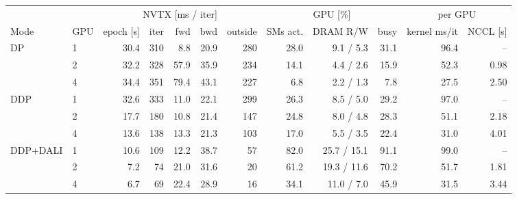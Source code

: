 \setlength{\tabcolsep}{3.8pt}
\begin{tabular}{@{}llrrrrrrrrrr@{}}
\toprule
& & \multicolumn{5}{c}{NVTX [ms / iter]} & \multicolumn{3}{c}{GPU [\%]} & \multicolumn{2}{c}{per GPU} \\
\cmidrule(lr){3-7}\cmidrule(lr){8-10}\cmidrule(l){11-12}
Mode & GPU & epoch [s] & iter & fwd & bwd & outside & SMs act. & DRAM R/W & busy & kernel ms/it & NCCL [s] \\
\midrule
\multirow{3}{*}{DP}       & 1 & 30.4 & 310 &  8.8 & 20.9 & 280 & 28.0 & 9.1 / 5.3 & 31.1 & 96.4 & -- \\
                          & 2 & 32.2 & 328 & 57.9 & 35.9 & 234 & 14.1 & 4.4 / 2.6 & 15.9 & 52.3 & 0.98 \\
                          & 4 & 34.4 & 351 & 79.4 & 43.1 & 227 &  6.8 & 2.2 / 1.3 &  7.8 & 27.5 & 2.50 \\
\midrule
\multirow{3}{*}{DDP}      & 1 & 32.6 & 333 & 11.0 & 22.1 & 299 & 26.3 & 8.5 / 5.0 & 29.2 & 97.0 & -- \\
                          & 2 & 17.7 & 180 & 10.8 & 21.4 & 147 & 24.8 & 8.0 / 4.8 & 28.3 & 51.1 & 2.18 \\
                          & 4 & 13.6 & 138 & 13.3 & 21.3 & 103 & 17.0 & 5.5 / 3.5 & 22.4 & 31.0 & 4.01 \\
\midrule
\multirow{3}{*}{DDP+DALI} & 1 & 10.6 & 109 & 12.2 & 38.7 &  57 & 82.0 & 25.7 / 15.1 & 91.1 & 99.0 & -- \\
                          & 2 &  7.2 &  74 & 21.0 & 31.6 &  20 & 61.2 & 19.3 / 11.6 & 70.2 & 51.7 & 1.81 \\
                          & 4 &  6.7 &  69 & 22.4 & 28.9 &  16 & 34.1 & 11.0 / 7.0 & 45.9 & 31.5 & 3.44 \\
\bottomrule
\end{tabular}
